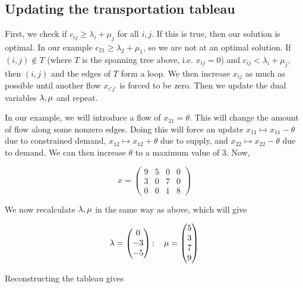 \subsection{Updating the transportation tableau}
First, we check if \( c_{ij} \geq \lambda_i + \mu_j \) for all \( i, j \).
If this is true, then our solution is optimal.
In our example \( c_{21} \geq \lambda_2 + \mu_1 \), so we are not at an optimal solution.
If \( (i,j) \notin T \) (where \( T \) is the spanning tree above, i.e.
\( x_{ij} = 0 \)) and \( c_{ij} < \lambda_i + \mu_j \), then \((i,j)\) and the edges of \( T \) form a loop.
We then increase \( x_{ij} \) as much as possible until another flow \(x_{i'j'}\) is forced to be zero.
Then we update the dual variables \( \vb \lambda, \vb \mu \) and repeat.

In our example, we will introduce a flow of \( x_{21} = \theta \).
This will change the amount of flow along some nonzero edges.
Doing this will force an update \( x_{11} \mapsto x_{11} - \theta \) due to constrained demand, \( x_{12} \mapsto x_{12} + \theta \) due to supply, and \( x_{22} \mapsto x_{22} - \theta \) due to demand.
We can then increase \( \theta \) to a maximum value of \( 3 \).
Now,

\[
	x = \begin{pmatrix}
		9 & 5 & 0 & 0 \\
		3 & 0 & 7 & 0 \\
		0 & 0 & 1 & 8
	\end{pmatrix}
\]

\noindent We now recalculate \( \vb\lambda,\vb\mu \) in the same way as above, which will give

\[
	\vb\lambda = \begin{pmatrix}
		0 \\-3\\-5
	\end{pmatrix};\quad \vb\mu = \begin{pmatrix}
		5 \\3\\7\\9
	\end{pmatrix}
\]

\noindent Reconstructing the tableau gives

